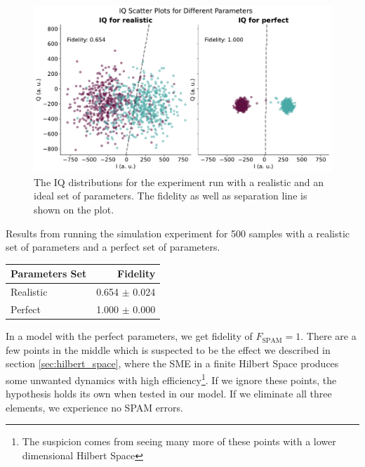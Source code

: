 \begin{figure}
    \centering
    \includegraphics[]{Simulations/budgets/figures/iq_scatter_budgetting_on_off_two.pdf}
    \caption{The IQ distributions for the experiment run with a realistic and an ideal set of parameters. The fidelity as well as separation line is shown on the plot. }
    \label{fig:realistic_perfect_comparison}
\end{figure}

\begin{margintable}
    \centering
    \caption{Results from running the simulation experiment for 500 samples with a realistic set of parameters and a perfect set of parameters.}
    \begin{tabular}{l|r}
    \hline
         Parameters Set & Fidelity \\ \hline
         Realistic & 0.654 $\pm$ 0.024  \\
         Perfect   & 1.000 $\pm$ 0.000  
    \end{tabular}
    \label{tab:realistic_perfect_comparison}
\end{margintable}
In a model with the perfect parameters, we get fidelity of $F_{\text{SPAM}} = 1$. There are a few points in the middle which is suspected to be the effect we described in section \ref{sec:hilbert_space}, where  the SME in a finite Hilbert Space produces some unwanted dynamics with high efficiency\footnote{The suspicion comes from seeing many more of these points with a lower dimensional Hilbert Space}. If we ignore these points, the hypothesis holds its own when tested in our model. If we eliminate all three elements, we experience no SPAM errors.


